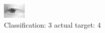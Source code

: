 \begin{figure}[h!]
\begin{center}
\includegraphics[width=0.60\columnwidth]{figures/ID2608_class_3_target_4.png}
\end{center}
\caption{ Classification: 3 actual target: 4}
\label{fig:ID2608_class_3_target_4}
\end{figure}
